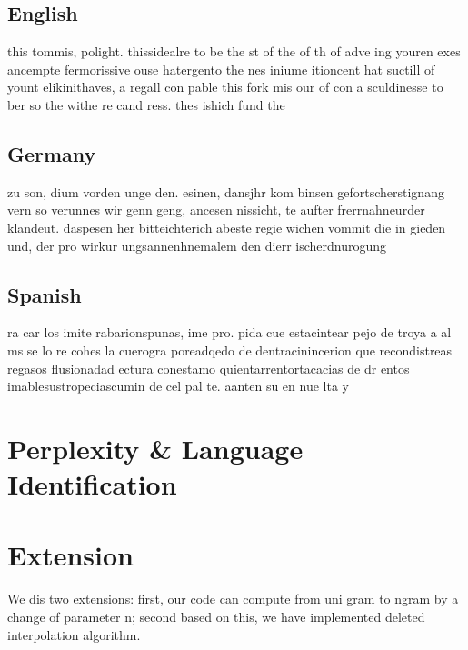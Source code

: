 \documentclass{article}
\begin{document}
\subsection{English}
this tommis, polight.
thissidealre to be the st of the of th of adve ing youren exes ancempte fermorissive ouse hatergento the nes iniume itioncent hat suctill of yount elikinithaves, a regall con pable this fork mis our of con a sculdinesse to ber so the withe re cand ress.
thes ishich fund the

\subsection{Germany}
zu son, dium vorden unge den.
esinen, dansjhr kom binsen gefortscherstignang vern so verunnes wir genn geng, ancesen nissicht, te aufter frerrnahneurder klandeut.
daspesen her bitteichterich abeste regie wichen vommit die in gieden und, der pro wirkur ungsannenhnemalem den dierr ischerdnurogung 

\subsection{Spanish}
ra car los imite rabarionspunas, ime pro.
pida cue estacintear pejo de troya a al ms se lo re cohes la cuerogra poreadqedo de dentracinincerion que recondistreas regasos flusionadad ectura conestamo quientarrentortacacias de dr entos imablesustropeciascumin de cel pal te.
aanten su en nue lta y 

\section{Perplexity \& Language Identification}\label{Per}


\section{Extension}
We dis two extensions: first, our code can compute from uni gram to ngram by a change of parameter n; second based on this, we have implemented deleted interpolation algorithm.
\end{document}
